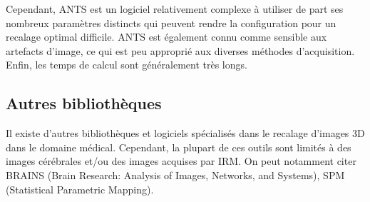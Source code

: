 \documentclass{article}
\begin{document}
{{        \bigskip

        Cependant, ANTS est un logiciel relativement complexe à utiliser de part ses nombreux paramètres distincts qui peuvent rendre la configuration pour un recalage optimal difficile. ANTS est également connu comme sensible aux artefacts d'image, ce qui est peu approprié aux diverses méthodes d'acquisition. Enfin, les temps de calcul sont généralement très longs.
    }

    {
        \bigskip
        \subsection{Autres bibliothèques}
        \label{subsec:other-related-work}

        Il existe d'autres bibliothèques et logiciels spécialisés dans le recalage d'images 3D dans le domaine médical. Cependant, la plupart de ces outils sont limités à des images cérébrales et/ou des images acquises par IRM. On peut notamment citer BRAINS (Brain Research: Analysis of Images, Networks, and Systems), SPM (Statistical Parametric Mapping).
    }

    \newpage
}
\end{document}
